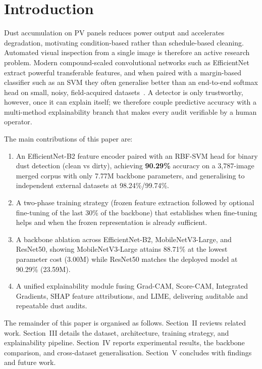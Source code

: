 \documentclass{IEEEtran}
\begin{document}
\section{Introduction}

Dust accumulation on PV panels reduces power output and accelerates degradation, motivating condition-based rather than schedule-based cleaning. Automated visual inspection from a single image is therefore an active research problem. Modern compound-scaled convolutional networks such as EfficientNet~\cite{tan2019efficientnet} extract powerful transferable features, and when paired with a margin-based classifier such as an SVM they often generalise better than an end-to-end softmax head on small, noisy, field-acquired datasets~\cite{bassil2025efficient}. A detector is only trustworthy, however, once it can explain itself; we therefore couple predictive accuracy with a multi-method explainability branch that makes every audit verifiable by a human operator.

The main contributions of this paper are:
\begin{enumerate}
\item An EfficientNet-B2 feature encoder paired with an RBF-SVM head for binary dust detection (clean vs dirty), achieving \textbf{90.29\%} accuracy on a 3,787-image merged corpus with only 7.77M backbone parameters, and generalising to independent external datasets at 98.24\%/99.74\%.
\item A two-phase training strategy (frozen feature extraction followed by optional fine-tuning of the last 30\% of the backbone) that establishes when fine-tuning helps and when the frozen representation is already sufficient.
\item A backbone ablation across EfficientNet-B2, MobileNetV3-Large, and ResNet50, showing MobileNetV3-Large attains 88.71\% at the lowest parameter cost (3.00M) while ResNet50 matches the deployed model at 90.29\% (23.59M).
\item A unified explainability module fusing Grad-CAM, Score-CAM, Integrated Gradients, SHAP feature attributions, and LIME, delivering auditable and repeatable dust audits.
\end{enumerate}

The remainder of this paper is organised as follows. Section~II reviews related work. Section~III details the dataset, architecture, training strategy, and explainability pipeline. Section~IV reports experimental results, the backbone comparison, and cross-dataset generalisation. Section~V concludes with findings and future work.
\end{document}
